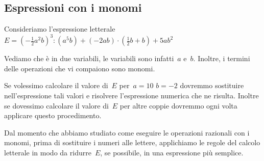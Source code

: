 
\subsection{Espressioni con i monomi}
\label{subsec:09_monomi_espressioni}

Consideriamo l'espressione letterale
$E=(-{\frac{1}{2}}a^{2}b)^{3}:(a^{5}b)+(-2ab)\cdot(\frac{1}{2}b+b)+5ab^{2}$

Vediamo che è in due variabili, le variabili sono infatti~$a$ e~$b$. Inoltre, i termini delle operazioni che vi compaiono sono monomi.

Se volessimo calcolare il valore di~$E$ per~$a = 10$ $b = -2$ dovremmo
sostituire nell'espressione tali valori e risolvere
l'espressione numerica che ne risulta. Inoltre se
dovessimo calcolare il valore di~$E$ per altre coppie dovremmo ogni volta
applicare questo procedimento.

Dal momento che abbiamo studiato come eseguire le operazioni razionali
con i monomi, prima di sostituire i numeri alle lettere, applichiamo le
regole del calcolo letterale in modo da ridurre~$E$, se possibile, in una
espressione più semplice.

